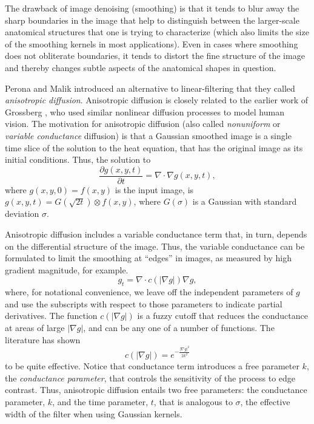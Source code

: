 %
%
%
%

The drawback of image denoising (smoothing) is that it tends to blur away the
sharp boundaries in the image that help to distinguish between the
larger-scale anatomical structures that one is trying to characterize (which
also limits the size of the smoothing kernels in most applications).  Even in
cases where smoothing does not obliterate boundaries, it tends to distort the
fine structure of the image and thereby changes subtle aspects of the
anatomical shapes in question.

Perona and Malik \cite{Perona1990} introduced an alternative to
linear-filtering that they called \emph{anisotropic diffusion}.  Anisotropic
diffusion is closely related to the earlier work of Grossberg
\cite{Grossberg1984}, who used similar nonlinear diffusion processes to model
human vision.  The motivation for anisotropic diffusion (also called
\emph{nonuniform} or \emph{variable conductance} diffusion) is that a Gaussian
smoothed image is a single time slice of the solution to the heat equation, 
that has the original image as its initial conditions.  Thus, the solution to
\begin{equation} \frac{\partial g(x, y, t) }{\partial t} = \nabla \cdot \nabla
g(x, y, t), \end{equation} where $g(x, y, 0) = f(x, y)$ is the input image, is
$g(x, y, t) = G(\sqrt{2t}) \otimes f(x, y)$, where $G(\sigma)$ is a Gaussian
with standard deviation $\sigma$.  

Anisotropic diffusion includes a variable conductance term that, in turn,
depends on the differential structure of the image.  Thus, the variable
conductance can be formulated to limit the smoothing at ``edges'' in images, as
measured by high gradient magnitude, for example. \begin{equation} g_{t} = \nabla \cdot
c(\left| \nabla g \right|) \nabla g, \label{eq:aniso} \end{equation} where, for
notational convenience, we leave off the independent parameters of $g$ and use
the subscripts with respect to those parameters to indicate partial
derivatives.  The function $c(|\nabla g|)$ is a fuzzy cutoff that reduces the
conductance at areas of large $|\nabla g|$, and can be any one of a number of
functions.  The literature has shown \begin{equation} c(|\nabla g|) =
e^{-\frac{|\nabla g|^{2}}{2k^{2}}} \end{equation} to be quite effective.
Notice that conductance term introduces a free parameter $k$, the {\em
conductance parameter}, that controls the sensitivity of the process to edge
contrast.  Thus, anisotropic diffusion entails two free parameters: the
conductance parameter, $k$, and the time parameter, $t$, that is analogous to
$\sigma$, the effective width of the filter when using Gaussian kernels.

